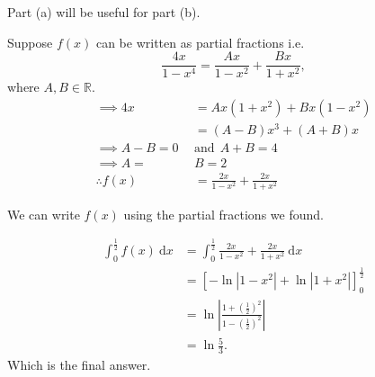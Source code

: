 \documentclass[a4paper, 11pt]{article}
\begin{document}
        \begin{solution}
            Part (a) will be useful for part (b). 

            \begin{solutionparts}
                \item Suppose \(f(x) \) can be written as partial fractions i.e. 
                \[ \frac{4x}{1-x^4} = \frac{Ax }{1 -x^2} + \frac{Bx }{1 + x^2},  \] where \(A, B \in \mathbb{R }\). 
                \begin{align*}
                    \implies 4x &= Ax(1+x^2) + Bx(1-x^2) \\
                    &= (A-B)x^3 + (A+B)x \\
                    \implies A - B = 0 ~~&\text{and}~~ A+B = 4 \\
                    \implies A = ~&B = 2 \\
                    \therefore f(x) &= \frac{2x}{1 - x^2} + \frac{2x}{1 + x^2}
                \end{align*}

                \item We can write \(f(x) \) using the partial fractions we found.
                
                \begin{align*}
                    \int_{0}^{\frac{1}{2}} f(x) ~ \mathrm{d} x  &= \int_{0}^{\frac{1}{2}} \frac{2x}{1 - x^2} + \frac{2x}{1 + x^2} ~ \mathrm{d} x \\
                    &= \left[ - \ln \left| 1 - x^2 \right| + \ln \left|1 + x^2 \right|\right]_0^\frac{1}{2} \\
                    &= \ln \left| \frac{1+ \left(\frac{1}{2}\right)^2}{1 - \left(\frac{1}{2}\right)^2}\right| \\
                    &= \ln \frac{5}{3}.
                \end{align*}
                Which is the final answer. 
            \end{solutionparts}
        \end{solution}
\end{document}

